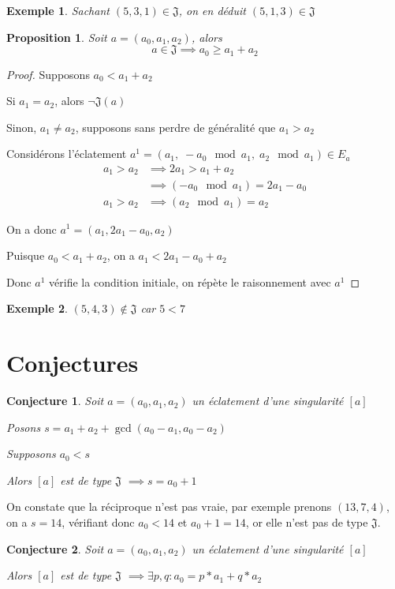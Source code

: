 \documentclass{article}
\newtheorem{proposition}{Proposition}
\newtheorem{conjecture}{Conjecture}
\newtheorem{exemple}{Exemple}
\begin{document}
\begin{exemple}
    Sachant $(5, 3, 1) \in \mathfrak{J}$, on en déduit $(5, 1, 3) \in \mathfrak{J}$
\end{exemple}

\newpage

\begin{proposition}
    Soit $a=(a_0, a_1, a_2)$, alors
    \[ a \in \mathfrak{J} \implies a_0 \geq a_1 + a_2 \]
\end{proposition}

\begin{proof}
    Supposons $a_0 < a_1 + a_2$

    Si $a_1 = a_2$, alors $\neg \mathfrak{J}(a)$

    Sinon, $a_1 \neq a_2$, supposons sans perdre de généralité que $a_1 > a_2$

    Considérons l'éclatement $a^1 = (a_1,\; -a_0 \mod a_1,\; a_2 \mod a_1) \in E_a$
    \begin{align*}
        a_1 > a_2 & \implies 2a_1 > a_1+a_2               \\
                  & \implies (-a_0 \mod a_1) = 2a_1 - a_0 \\
        a_1 > a_2 & \implies (a_2 \mod a_1) = a_2
    \end{align*}

    On a donc $a^1 = (a_1, 2a_1-a_0, a_2)$

    Puisque $a_0 < a_1 + a_2$, on a $a_1 < 2a_1 - a_0 + a_2$

    Donc $a^1$ vérifie la condition initiale, on répète le raisonnement avec $a^1$
\end{proof}

\begin{exemple}
    $(5, 4, 3) \not \in \mathfrak{J}$ car $5 < 7$
\end{exemple}

\section{Conjectures}

\begin{conjecture}
    Soit $a=(a_0, a_1, a_2)$ un éclatement d'une singularité $[a]$

    Posons $s = a_1 + a_2 + \gcd(a_0-a_1, a_0-a_2)$

    Supposons $a_0 < s$

    Alors $[a]$ est de type $\mathfrak{J}$ $\implies s = a_0 + 1$
\end{conjecture}

On constate que la réciproque n'est pas vraie, par exemple prenons $(13, 7, 4)$, on a $s = 14$, vérifiant donc $a_0 < 14$ et $a_0 + 1 = 14$, or elle n'est pas de type $\mathfrak{J}$.

\begin{conjecture}
    Soit $a=(a_0, a_1, a_2)$ un éclatement d'une singularité $[a]$

    Alors $[a]$ est de type $\mathfrak{J}$ $\implies \exists p, q: a_0 = p*a_1 + q*a_2$
\end{conjecture}
\end{document}
